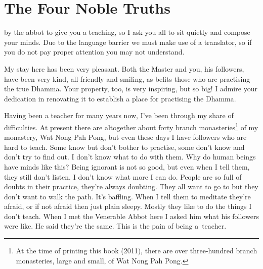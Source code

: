 
\chapter{The Four Noble Truths}

 by the abbot to give you a teaching, so I ask you all to sit quietly and compose your minds. Due to the language barrier we must make use of a translator, so if you do not pay proper attention you may not understand.

My stay here has been very pleasant. Both the Master and you, his followers, have been very kind, all friendly and smiling, as befits those who are practising the true Dhamma. Your property, too, is very inspiring, but so big! I admire your dedication in renovating it to establish a place for practising the Dhamma.

Having been a teacher for many years now, I've been through my share of difficulties. At present there are altogether about forty branch monasteries\footnote{At the time of printing this book (2011), there are over three-hundred branch monasteries, large and small, of Wat Nong Pah Pong.} of my monastery, Wat Nong Pah Pong, but even these days I have followers who are hard to teach. Some know but don't bother to practise, some don't know and don't try to find out. I don't know what to do with them. Why do human beings have minds like this? Being ignorant is not so good, but even when I tell them, they still don't listen. I don't know what more I can do. People are so full of doubts in their practice, they're always doubting. They all want to go to  but they don't want to walk the path. It's baffling. When I tell them to meditate they're afraid, or if not afraid then just plain sleepy. Mostly they like to do the things I don't teach. When I met the Venerable Abbot here I asked him what his followers were like. He said they're the same. This is the pain of being a~teacher.

